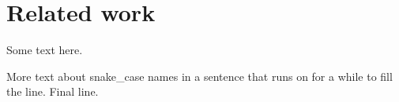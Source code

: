 \section{Related work}
Some text here.

More text about snake_case names in a sentence that runs on for a while to fill the line.
Final line.
